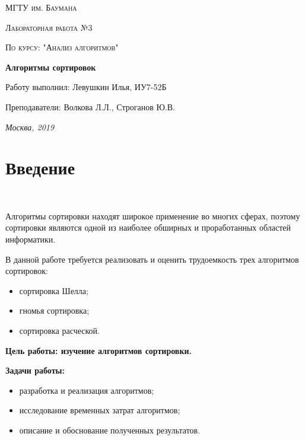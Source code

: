\documentclass[12pt]{report}
\begin{document}
	\begin{titlepage}
		\centering
		{\scshape\LARGE МГТУ им. Баумана \par}
		\vspace{3cm}
		{\scshape\Large Лабораторная работа №3\par}
		\vspace{0.5cm}	
		{\scshape\Large По курсу: "Анализ алгоритмов"\par}
		\vspace{1.5cm}
		{\huge\bfseries Алгоритмы сортировок\par}
		\vspace{2cm}
		{\Large Работу выполнил: Левушкин Илья, ИУ7-52Б\par}
		\vspace{0.5cm}
		{\Large Преподаватели:  Волкова Л.Л., Строганов Ю.В.\par}
		
		\vfill
		\large \textit {Москва, 2019} \par
	\end{titlepage}
	
	\tableofcontents
	
	\newpage
	\chapter*{Введение}
	
	~\
	
	Алгоритмы сортировки находят широкое применение во многих сферах,
	поэтому сортировки являются одной из наиболее обширных и проработанных областей информатики.
	
	В данной работе требуется реализовать и оценить трудоемкость трех
	алгоритмов сортировок:
	
	\begin{itemize}
		\item сортировка Шелла;
		\item гномья сортировка;
		\item сортировка расческой.
	\end{itemize}

   {\bf Цель работы: изучение алгоритмов сортировки.}
   
   {\bf Задачи работы:}
   
   \begin{itemize}
   	\item разработка и реализация алгоритмов;
   	\item исследование временных затрат алгоритмов;
   	\item описание и обоснование полученных результатов.
   \end{itemize}
\end{document}
